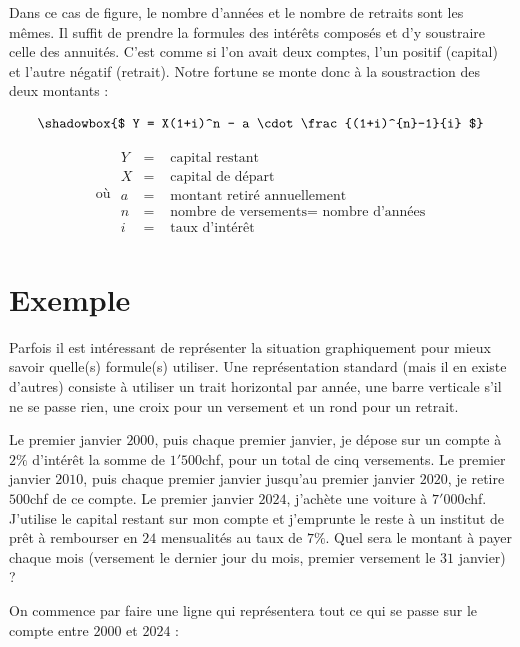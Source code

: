 Dans ce cas de figure, le nombre d'années et le nombre de retraits sont les mêmes. Il suffit de prendre la formules des intérêts composés et d'y soustraire celle des annuités. C'est comme si l'on avait deux comptes, l'un positif (capital) et l'autre négatif (retrait). Notre fortune se monte donc à la soustraction des deux montants :

\begin{equation*}
\shadowbox{$
Y = X(1+i)^n - a \cdot \frac{(1+i)^{n}-1}{i} $}
\end{equation*}

\begin{equation*}
\mbox{ où } 
\begin{array}{lll}
Y&=&\mbox{ capital restant}\\
X&=&\mbox{ capital de départ}\\
a&=&\mbox{ montant retiré annuellement}\\
n&=&\mbox{ nombre de versements} = \mbox{ nombre d'années}\\
i&=&\mbox{ taux d'intérêt}\\
\end{array}
\end{equation*}

\section{Exemple}

Parfois il est intéressant de représenter la situation graphiquement pour mieux savoir quelle(s) formule(s) utiliser. Une représentation standard (mais il en existe d'autres) consiste à utiliser un trait horizontal par année, une barre verticale s'il ne se passe rien, une croix pour un versement et un rond pour un retrait.

\begin{exemple}
Le premier janvier $2000$, puis chaque premier janvier, je dépose sur un compte à $2\%$ d'intérêt la somme de $1'500$chf, pour un total de cinq versements. Le premier janvier $2010$, puis chaque premier janvier jusqu'au premier janvier $2020$, je retire $500$chf de ce compte. Le premier janvier $2024$, j'achète une voiture à $7'000$chf. J'utilise le capital restant sur mon compte et j'emprunte le reste à un institut de prêt à rembourser en $24$ mensualités au taux de $7\%$. Quel sera le montant à payer chaque mois (versement le dernier jour du mois, premier versement le $31$ janvier) ?
\end{exemple}

On commence par faire une ligne qui représentera tout ce qui se passe sur le compte entre $2000$ et $2024$ :

